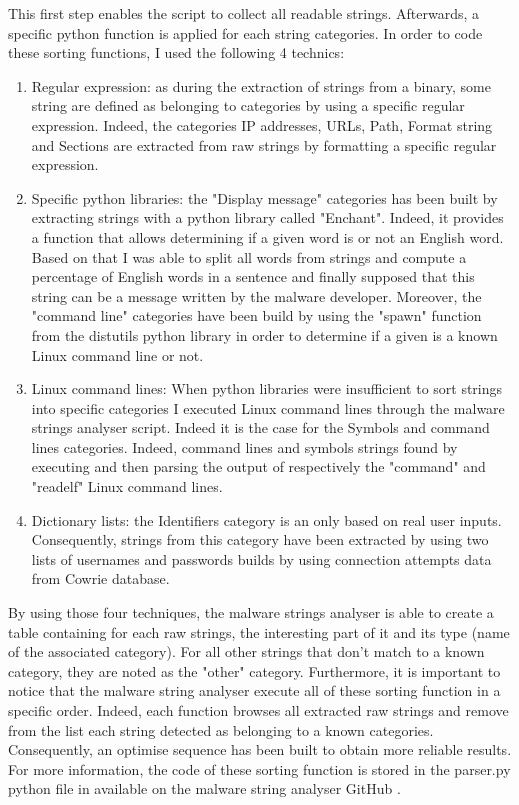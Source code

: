 This first step enables the script to collect all readable strings. Afterwards, a specific 
python function is applied for each string categories.
In order to code these sorting functions, I used the following 4 technics:
\begin{enumerate}
  \item Regular expression: as during the extraction of strings from a binary, some string
  are defined as belonging to categories by using a specific regular expression.
  Indeed, the categories IP addresses, URLs, Path, Format string and Sections are extracted
  from raw strings by formatting a specific regular expression.
  \item Specific python libraries: the "Display message" categories has been built by extracting
  strings with a python library called "Enchant". Indeed, it provides a function that allows determining if a given word is or not an English word. Based on that I was able to split all
  words from strings and compute a percentage of English words in a sentence and finally
  supposed that this string can be a message written by the malware developer. Moreover, 
  the "command line" categories have been build by using the "spawn" function from the distutils
  python library in order to determine if a given is a known Linux command line or not.
  \item Linux command lines: When python libraries were insufficient to sort strings into specific categories I executed Linux command lines through the malware strings analyser
  script. Indeed it is the case for the Symbols and command lines categories. Indeed, command 
  lines and symbols strings found by executing and then parsing the output of respectively
  the "command" and "readelf" \cite{readelf} Linux command lines.
  \item Dictionary lists: the Identifiers category is an only based on real user inputs.
  Consequently, strings from this category have been extracted by using two lists of usernames
  and passwords builds by using connection attempts data from Cowrie database.
\end{enumerate}

By using those four techniques, the malware strings analyser is able to create a table containing
for each raw strings, the interesting part of it and its type (name of the associated category).
For all other strings that don't match to a known category, they are noted as the "other" category.
Furthermore, it is important to notice that the malware string analyser execute all of these 
sorting function in a specific order. Indeed, each function browses all extracted raw strings
and remove from the list each string detected as belonging to a known categories.
Consequently, an optimise sequence has been built to obtain more reliable results.
For more information, the code of these sorting function is stored in the parser.py python
file in available on the malware string analyser GitHub \cite{msa}.

